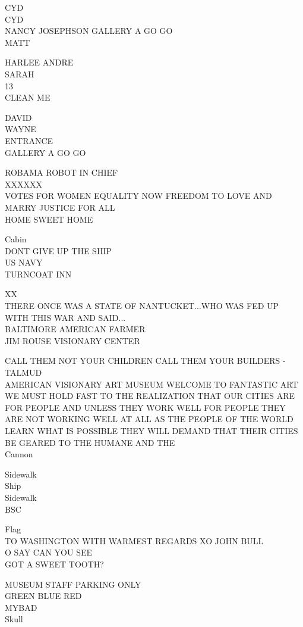 \documentclass[10pt,letterpaper]{article}
\begin{document}
CYD\\
CYD\\
NANCY JOSEPHSON GALLERY A GO GO\\
MATT

HARLEE ANDRE\\
SARAH\\
13\\
CLEAN ME

DAVID\\
WAYNE\\
ENTRANCE\\
GALLERY A GO GO

ROBAMA ROBOT IN CHIEF\\
XXXXXX\\
VOTES FOR WOMEN EQUALITY NOW FREEDOM TO LOVE AND MARRY JUSTICE FOR ALL\\
HOME SWEET HOME

Cabin\\
DONT GIVE UP THE SHIP\\
US NAVY\\
TURNCOAT INN

XX\\
THERE ONCE WAS A STATE OF NANTUCKET...WHO WAS FED UP WITH THIS WAR AND SAID...\\
BALTIMORE AMERICAN FARMER\\
JIM ROUSE VISIONARY CENTER

CALL THEM NOT YOUR CHILDREN CALL THEM YOUR BUILDERS {-} TALMUD\\
AMERICAN VISIONARY ART MUSEUM WELCOME TO FANTASTIC ART\\
WE MUST HOLD FAST TO THE REALIZATION THAT OUR CITIES ARE FOR PEOPLE AND UNLESS THEY WORK WELL FOR PEOPLE THEY ARE NOT WORKING WELL AT ALL AS THE PEOPLE OF THE WORLD LEARN WHAT IS POSSIBLE THEY WILL DEMAND THAT THEIR CITIES BE GEARED TO THE HUMANE AND THE\\
Cannon

Sidewalk\\
Ship\\
Sidewalk\\
BSC

Flag\\
TO WASHINGTON WITH WARMEST REGARDS XO JOHN BULL\\
O SAY CAN YOU SEE\\
GOT A SWEET TOOTH?

MUSEUM STAFF PARKING ONLY\\
GREEN BLUE RED\\
MYBAD\\
Skull
\end{document}
